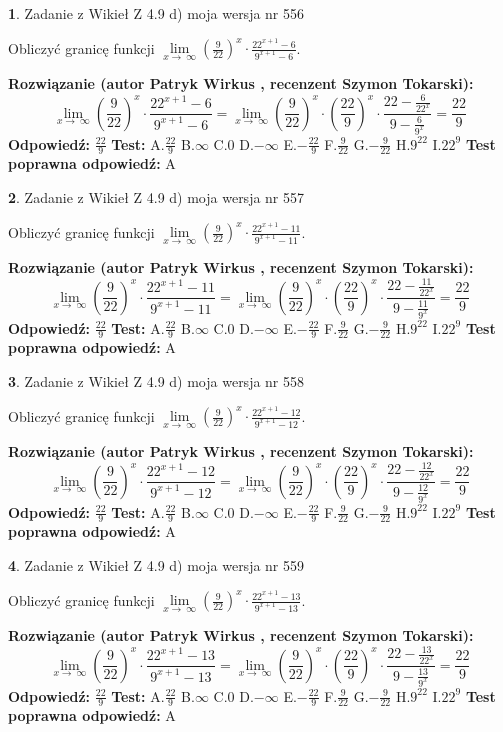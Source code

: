 \documentclass[12pt, a4paper]{article}
\theoremstyle{definition} %
\newtheorem{zad}{}
\newcommand{\zadStart}[1]{\begin{zad}#1\newline}
\newcommand{\zadStop}{\end{zad}}
\newcommand{\rozwStart}[2]{\noindent \textbf{Rozwiązanie (autor #1 , recenzent #2): }\newline}
\newcommand{\rozwStop}{\newline}
\newcommand{\odpStart}{\noindent \textbf{Odpowiedź:}\newline}
\newcommand{\odpStop}{\newline}
\newcommand{\testStart}{\noindent \textbf{Test:}\newline}
\newcommand{\testStop}{\newline}
\newcommand{\kluczStart}{\noindent \textbf{Test poprawna odpowiedź:}\newline}
\newcommand{\kluczStop}{\newline}
\begin{document}
\zadStart{Zadanie z Wikieł Z 4.9 d) moja wersja nr 556}


Obliczyć granicę funkcji  $\lim\limits_{x\to\ \infty}(\frac{9}{22})^{x}\cdot\frac{22^{x+1}-6}{9^{x+1}-6}$.
\zadStop
\rozwStart{Patryk Wirkus}{Szymon Tokarski}
$$\lim\limits_{x\to\ \infty}(\frac{9}{22})^{x}\cdot\frac{22^{x+1}-6}{9^{x+1}-6}=\lim\limits_{x\to\ \infty}(\frac{9}{22})^{x}\cdot(\frac{22}{9})^{x} \cdot \frac{22-\frac{6}{22^{x}}}{9-\frac{6}{9^{x}}} = \frac{22}{9}$$
\rozwStop
\odpStart
$\frac{22}{9}$
\odpStop
\testStart
A.$\frac{22}{9}$ B.$\infty$ C.$0$ D.$-\infty$ E.$-\frac{22}{9}$
F.$\frac{9}{22}$ G.$-\frac{9}{22}$
H.$9^{22}$
I.$22^{9}$
\testStop
\kluczStart
A
\kluczStop



\zadStart{Zadanie z Wikieł Z 4.9 d) moja wersja nr 557}


Obliczyć granicę funkcji  $\lim\limits_{x\to\ \infty}(\frac{9}{22})^{x}\cdot\frac{22^{x+1}-11}{9^{x+1}-11}$.
\zadStop
\rozwStart{Patryk Wirkus}{Szymon Tokarski}
$$\lim\limits_{x\to\ \infty}(\frac{9}{22})^{x}\cdot\frac{22^{x+1}-11}{9^{x+1}-11}=\lim\limits_{x\to\ \infty}(\frac{9}{22})^{x}\cdot(\frac{22}{9})^{x} \cdot \frac{22-\frac{11}{22^{x}}}{9-\frac{11}{9^{x}}} = \frac{22}{9}$$
\rozwStop
\odpStart
$\frac{22}{9}$
\odpStop
\testStart
A.$\frac{22}{9}$ B.$\infty$ C.$0$ D.$-\infty$ E.$-\frac{22}{9}$
F.$\frac{9}{22}$ G.$-\frac{9}{22}$
H.$9^{22}$
I.$22^{9}$
\testStop
\kluczStart
A
\kluczStop



\zadStart{Zadanie z Wikieł Z 4.9 d) moja wersja nr 558}


Obliczyć granicę funkcji  $\lim\limits_{x\to\ \infty}(\frac{9}{22})^{x}\cdot\frac{22^{x+1}-12}{9^{x+1}-12}$.
\zadStop
\rozwStart{Patryk Wirkus}{Szymon Tokarski}
$$\lim\limits_{x\to\ \infty}(\frac{9}{22})^{x}\cdot\frac{22^{x+1}-12}{9^{x+1}-12}=\lim\limits_{x\to\ \infty}(\frac{9}{22})^{x}\cdot(\frac{22}{9})^{x} \cdot \frac{22-\frac{12}{22^{x}}}{9-\frac{12}{9^{x}}} = \frac{22}{9}$$
\rozwStop
\odpStart
$\frac{22}{9}$
\odpStop
\testStart
A.$\frac{22}{9}$ B.$\infty$ C.$0$ D.$-\infty$ E.$-\frac{22}{9}$
F.$\frac{9}{22}$ G.$-\frac{9}{22}$
H.$9^{22}$
I.$22^{9}$
\testStop
\kluczStart
A
\kluczStop



\zadStart{Zadanie z Wikieł Z 4.9 d) moja wersja nr 559}


Obliczyć granicę funkcji  $\lim\limits_{x\to\ \infty}(\frac{9}{22})^{x}\cdot\frac{22^{x+1}-13}{9^{x+1}-13}$.
\zadStop
\rozwStart{Patryk Wirkus}{Szymon Tokarski}
$$\lim\limits_{x\to\ \infty}(\frac{9}{22})^{x}\cdot\frac{22^{x+1}-13}{9^{x+1}-13}=\lim\limits_{x\to\ \infty}(\frac{9}{22})^{x}\cdot(\frac{22}{9})^{x} \cdot \frac{22-\frac{13}{22^{x}}}{9-\frac{13}{9^{x}}} = \frac{22}{9}$$
\rozwStop
\odpStart
$\frac{22}{9}$
\odpStop
\testStart
A.$\frac{22}{9}$ B.$\infty$ C.$0$ D.$-\infty$ E.$-\frac{22}{9}$
F.$\frac{9}{22}$ G.$-\frac{9}{22}$
H.$9^{22}$
I.$22^{9}$
\testStop
\kluczStart
A
\kluczStop
\end{document}
